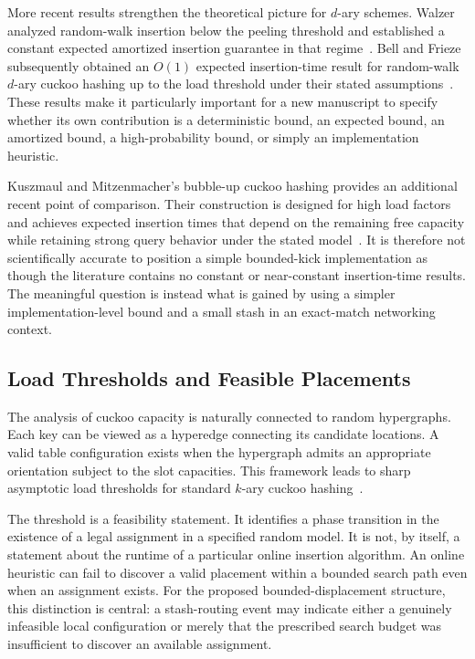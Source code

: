 \documentclass[conference]{IEEEtran}
\begin{document}
More recent results strengthen the theoretical picture for $d$-ary schemes. Walzer analyzed random-walk insertion below the peeling threshold and established a constant expected amortized insertion guarantee in that regime~\cite{walzer2022insertion}. Bell and Frieze subsequently obtained an $O(1)$ expected insertion-time result for random-walk $d$-ary cuckoo hashing up to the load threshold under their stated assumptions~\cite{bell2024constant}. These results make it particularly important for a new manuscript to specify whether its own contribution is a deterministic bound, an expected bound, an amortized bound, a high-probability bound, or simply an implementation heuristic.

Kuszmaul and Mitzenmacher's bubble-up cuckoo hashing provides an additional recent point of comparison. Their construction is designed for high load factors and achieves expected insertion times that depend on the remaining free capacity while retaining strong query behavior under the stated model~\cite{kuszmaul2025bubbling}. It is therefore not scientifically accurate to position a simple bounded-kick implementation as though the literature contains no constant or near-constant insertion-time results. The meaningful question is instead what is gained by using a simpler implementation-level bound and a small stash in an exact-match networking context.

\subsection{Load Thresholds and Feasible Placements}

The analysis of cuckoo capacity is naturally connected to random hypergraphs. Each key can be viewed as a hyperedge connecting its candidate locations. A valid table configuration exists when the hypergraph admits an appropriate orientation subject to the slot capacities. This framework leads to sharp asymptotic load thresholds for standard $k$-ary cuckoo hashing~\cite{fountoulakis2012sharp,dietzfelbinger2009tight}.

The threshold is a feasibility statement. It identifies a phase transition in the existence of a legal assignment in a specified random model. It is not, by itself, a statement about the runtime of a particular online insertion algorithm. An online heuristic can fail to discover a valid placement within a bounded search path even when an assignment exists. For the proposed bounded-displacement structure, this distinction is central: a stash-routing event may indicate either a genuinely infeasible local configuration or merely that the prescribed search budget was insufficient to discover an available assignment.
\end{document}
